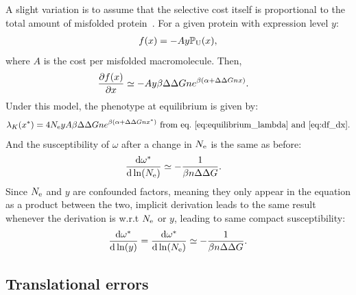 A slight variation is to assume that the selective cost itself is proportional to the total amount of misfolded protein~\citep{Drummond2005a, Wilke2006, Drummond2008, Serohijos2012}. For a given protein with expression level $y$:
\begin{align}
f (x) = - A y \mathbb{P}_{\textrm{U}} (x),
\end{align}
where $A$ is the cost per misfolded macromolecule.
Then,
\begin{align}
\frac{\partial  f (x)}{\partial x} & \simeq -A y \beta \Delta \Delta G n e^{\beta(\alpha + \Delta \Delta G n x)}.
\end{align}
Under this model, the phenotype at equilibrium is given by:
\begin{align}
\lambda_{K}(x^{*}) = 4N_{\mathrm{e}} y A \beta \Delta \Delta G n e^{\beta(\alpha + \Delta \Delta G n x^{*})} \text{ from eq.~\ref{eq:equilibrium_lambda} and~\ref{eq:df_dx}}.
\end{align}
And the susceptibility of $\omega$ after a change in $N_{\mathrm{e}}$ is the same as before:
\begin{align}
\frac{ \mathrm{d} \omega^{*}}{\mathrm{d} \ln (N_{\mathrm{e}})} & \simeq - \frac{1}{\beta n \Delta \Delta G}.
\end{align}
Since $N_{\mathrm{e}}$ and $y$ are confounded factors, meaning they only appear in the equation as a product between the two, implicit derivation leads to the same result whenever the derivation is w.r.t $N_{\mathrm{e}}$ or $y$, leading to same compact susceptibility:
\begin{align}
\frac{ \mathrm{d} \omega^{*}}{\mathrm{d} \ln (y)} = \frac{ \mathrm{d} \omega^{*}}{\mathrm{d} \ln (N_{\mathrm{e}})} \simeq - \frac{1}{\beta n \Delta \Delta G}.
\end{align}

\subsection{Translational errors}
\label{subsec:translational-errors}

